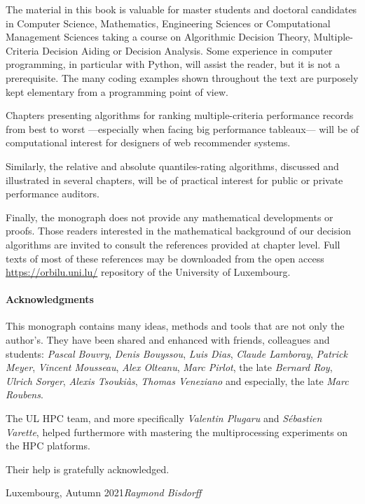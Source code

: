 
The material in this book is valuable for master students and doctoral candidates in Computer Science, Mathematics, Engineering Sciences or Computational Management Sciences taking a course on Algorithmic Decision Theory, Multiple-Criteria Decision Aiding or Decision Analysis. Some experience in computer programming, in particular with Python, will assist the reader, but it is not a prerequisite. The many coding examples shown throughout the text are purposely kept elementary from a programming point of view. 

Chapters presenting algorithms for ranking multiple-criteria performance records from best to worst ---especially when facing big performance tableaux--- will be of computational interest for designers of web recommender systems. 

Similarly, the relative and absolute quantiles-rating algorithms, discussed and illustrated in several chapters, will be of practical interest for public or private performance auditors.

Finally, the monograph does not provide any mathematical developments or proofs. Those readers interested in the mathematical background of our decision algorithms are invited to consult the references provided at chapter level. Full texts of most of these references may be downloaded from the open access \href{https://orbilu.uni.lu/}{https://orbilu.uni.lu/} repository of the University of Luxembourg. 

\pagebreak

\paragraph{\textbf{Acknowledgments}}

This monograph contains many ideas, methods and tools that are not only the author’s. They have been shared and enhanced with friends, colleagues and students: \emph{Pascal Bouvry}, \emph{Denis Bouyssou}, \emph{Luis Dias}, \emph{Claude Lamboray}, \emph{Patrick Meyer}, \emph{Vincent Mousseau}, \emph{Alex Olteanu}, \emph{Marc Pirlot}, the late \emph{Bernard Roy}, \emph{Ulrich Sorger}, \emph{Alexis Tsouki\`as}, \emph{Thomas Veneziano} and especially, the late \emph{Marc Roubens}.

The UL HPC team, and more specifically \emph{Valentin Plugaru} and \emph{Sébastien Varette}, helped furthermore with mastering the multiprocessing experiments on the HPC platforms.

Their help is gratefully acknowledged.

\vspace{\baselineskip}
\begin{flushright}\noindent
Luxembourg, Autumn 2021\hfill \emph{Raymond Bisdorff}\\
\end{flushright}


